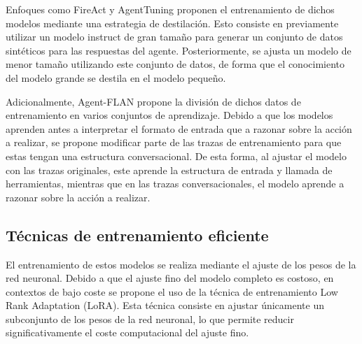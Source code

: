 Enfoques como FireAct\cite{chen_fireact_2023} y AgentTuning\cite{zeng_agenttuning_2023} proponen el entrenamiento de dichos modelos mediante una estrategia de destilación. Esto consiste en previamente utilizar un modelo instruct de gran tamaño para generar un conjunto de datos sintéticos para las respuestas del agente. Posteriormente, se ajusta un modelo de menor tamaño utilizando este conjunto de datos, de forma que el conocimiento del modelo grande se destila en el modelo pequeño.

Adicionalmente, Agent-FLAN\cite{chen_agent-flan_2024} propone la división de dichos datos de entrenamiento en varios conjuntos de aprendizaje. Debido a que los modelos aprenden antes a interpretar el formato de entrada que a razonar sobre la acción a realizar, se propone modificar parte de las trazas de entrenamiento para que estas tengan una estructura conversacional.
De esta forma, al ajustar el modelo con las trazas originales, este aprende la estructura de entrada y llamada de herramientas, mientras que en las trazas conversacionales, el modelo aprende a razonar sobre la acción a realizar.

\subsection{Técnicas de entrenamiento eficiente}
El entrenamiento de estos modelos se realiza mediante el ajuste de los pesos de la red neuronal. Debido a que el ajuste fino del modelo completo es costoso, en contextos de bajo coste se propone el uso de la técnica de entrenamiento Low Rank Adaptation (LoRA)\cite{hu_lora_2021}. Esta técnica consiste en ajustar únicamente un subconjunto de los pesos de la red neuronal, lo que permite reducir significativamente el coste computacional del ajuste fino.























